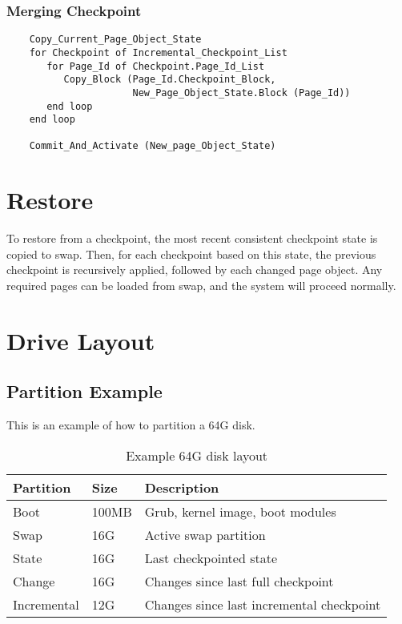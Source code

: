 \subsubsection{Merging Checkpoint}

\begin{verbatim}
    Copy_Current_Page_Object_State
    for Checkpoint of Incremental_Checkpoint_List
       for Page_Id of Checkpoint.Page_Id_List
          Copy_Block (Page_Id.Checkpoint_Block,
                      New_Page_Object_State.Block (Page_Id))
       end loop
    end loop
    
    Commit_And_Activate (New_page_Object_State)
\end{verbatim}

\section{Restore}

To restore from a checkpoint, the most recent consistent checkpoint state is copied to swap.  Then, for each checkpoint based on this state, the previous checkpoint is recursively applied, followed by each changed page object.   Any required pages can be loaded from swap, and the system will proceed normally.

\section{Drive Layout}

\subsection{Partition Example}

This is an example of how to partition a 64G disk.

\begin{table}[ht]
\begin{tabular}{l l l}
\hline\hline
Partition & Size & Description \\
\hline
Boot  & 100MB & Grub, kernel image, boot modules \\
Swap  & 16G & Active swap partition \\
State & 16G & Last checkpointed state \\
Change & 16G & Changes since last full checkpoint \\
Incremental & 12G & Changes since last incremental checkpoint \\
\hline
\end{tabular}
\caption{Example 64G disk layout}
\label{table:100gdisklayout}
\end{table}

